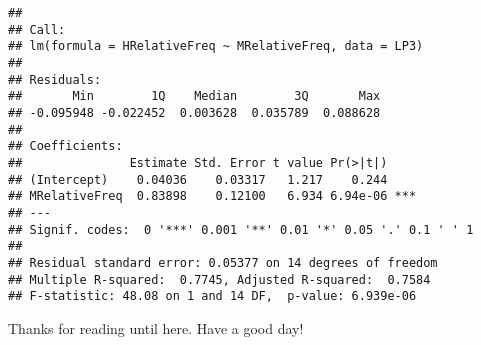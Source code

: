 \documentclass[]{article}
\begin{document}
\begin{verbatim}
## 
## Call:
## lm(formula = HRelativeFreq ~ MRelativeFreq, data = LP3)
## 
## Residuals:
##       Min        1Q    Median        3Q       Max 
## -0.095948 -0.022452  0.003628  0.035789  0.088628 
## 
## Coefficients:
##               Estimate Std. Error t value Pr(>|t|)    
## (Intercept)    0.04036    0.03317   1.217    0.244    
## MRelativeFreq  0.83898    0.12100   6.934 6.94e-06 ***
## ---
## Signif. codes:  0 '***' 0.001 '**' 0.01 '*' 0.05 '.' 0.1 ' ' 1
## 
## Residual standard error: 0.05377 on 14 degrees of freedom
## Multiple R-squared:  0.7745, Adjusted R-squared:  0.7584 
## F-statistic: 48.08 on 1 and 14 DF,  p-value: 6.939e-06
\end{verbatim}

Thanks for reading until here. Have a good day!
\end{document}
